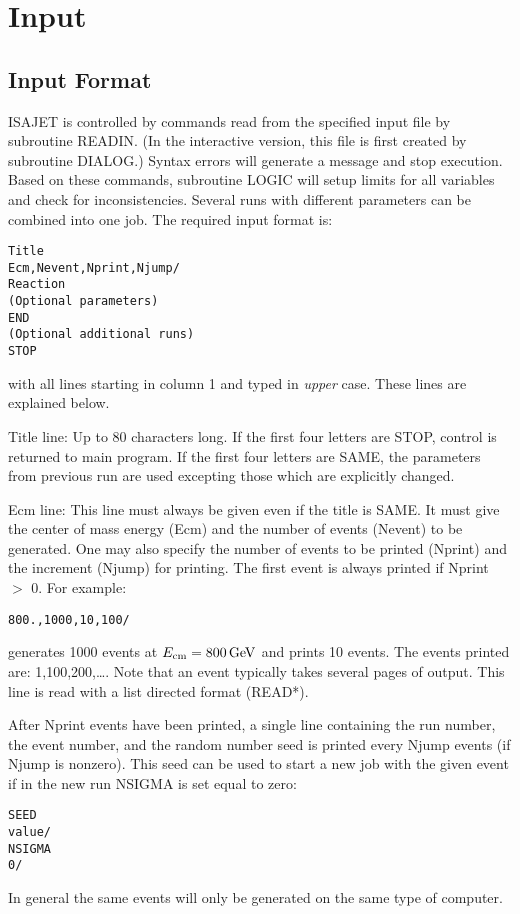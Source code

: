 \newpage
\section{Input\label{INPUT}}

\subsection{Input Format}

      ISAJET is controlled by commands read from the specified input
file by subroutine READIN. (In the interactive version, this file is
first created by subroutine DIALOG.) Syntax errors will generate a
message and stop execution. Based on these commands, subroutine LOGIC
will setup limits for all variables and check for inconsistencies.
Several runs with different parameters can be combined into one job.
The required input format is:
\begin{verbatim}
Title
Ecm,Nevent,Nprint,Njump/
Reaction
(Optional parameters)
END
(Optional additional runs)
STOP
\end{verbatim}
with all lines starting in column 1 and typed in {\it upper} case. These
lines are explained below.

      Title line: Up to 80 characters long. If the first four letters
are STOP, control is returned to main program. If the first four letters
are SAME, the parameters from previous run are used excepting those
which are explicitly changed.

      Ecm line: This line must always be given even if the title is
SAME. It must give the center of mass energy (Ecm) and the number of
events (Nevent) to be generated. One may also specify the number of
events to be printed (Nprint) and the increment (Njump) for printing.
The first event is always printed if Nprint $>$ 0. For example:
\begin{verbatim}
800.,1000,10,100/
\end{verbatim}
generates 1000 events at $E_{\rm cm} = 800\,{\rm GeV}$ and prints 10
events. The events printed are: 1,100,200,\dots. Note that an event
typically takes several pages of output. This line is read with a list
directed format (READ*).

     After Nprint events have been printed, a single line containing the
run number, the event number, and the random number seed is printed
every Njump events (if Njump is nonzero). This seed can be used to start
a new job with the given event if in the new run NSIGMA is set equal to
zero:
\begin{verbatim}
SEED
value/
NSIGMA
0/
\end{verbatim}
In general the same events will only be generated on the same type of
computer.

